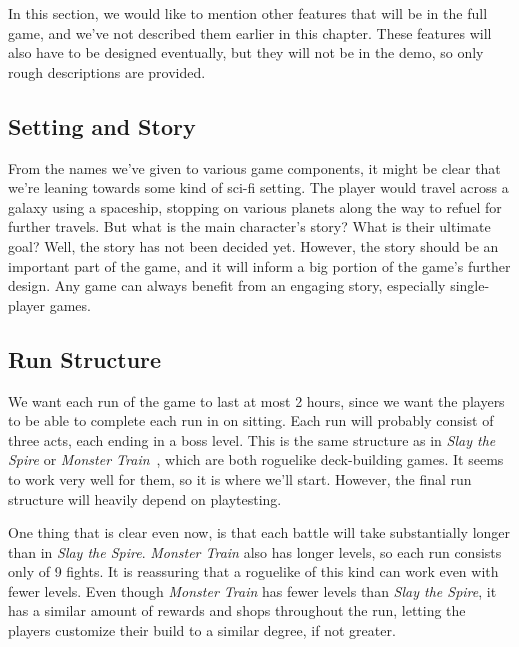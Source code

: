 In this section, we would like to mention other features that will be in the full game, and we've not described them earlier in this chapter.
These features will also have to be designed eventually, but they will not be in the demo, so only rough descriptions are provided.

\begin{notindemo}

    \subsection{Setting and Story}

    From the names we've given to various game components, it might be clear that we're leaning towards some kind of sci-fi setting.
    The player would travel across a galaxy using a spaceship, stopping on various planets along the way to refuel for further travels.
    But what is the main character's story?
    What is their ultimate goal?
    Well, the story has not been decided yet.
    However, the story should be an important part of the game, and it will inform a big portion of the game's further design.
    Any game can always benefit from an engaging story, especially single-player games.

    \subsection{Run Structure}

    We want each run of the game to last at most 2 hours, since we want the players to be able to complete each run in on sitting.
    Each run will probably consist of three acts, each ending in a boss level.
    This is the same structure as in \emph{Slay the Spire} or \emph{Monster Train}~\cite{MonsterTrain}, which are both roguelike deck-building games.
    It seems to work very well for them, so it is where we'll start.
    However, the final run structure will heavily depend on playtesting.

    One thing that is clear even now, is that each battle will take substantially longer than in \emph{Slay the Spire}.
    \emph{Monster Train} also has longer levels, so each run consists only of 9 fights.
    It is reassuring that a roguelike of this kind can work even with fewer levels.
    Even though \emph{Monster Train} has fewer levels than \emph{Slay the Spire}, it has a similar amount of rewards and shops throughout the run, letting the players customize their build to a similar degree, if not greater.


\end{notindemo}
